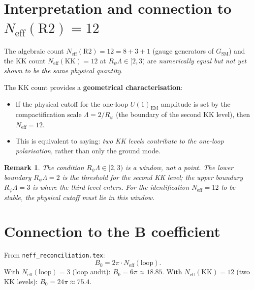 \documentclass[12pt,a4paper]{article}
\newtheorem{remark}{Remark}[section]
\newcommand{\Neff}{N_{\mathrm{eff}}}
\begin{document}
\section{Interpretation and connection to $N_{\mathrm{eff}}(\mathrm{R2}) = 12$}

The algebraic count $\Neff(\mathrm{R2}) = 12 = 8 + 3 + 1$ (gauge generators
of $G_{\mathrm{SM}}$) and the KK count $\Neff(\mathrm{KK}) = 12$ at $R_\psi\Lambda \in [2,3)$
are \emph{numerically equal but not yet shown to be the same physical quantity}.

The KK count provides a \textbf{geometrical characterisation}:
\begin{itemize}
  \item If the physical cutoff for the one-loop $U(1)_{\mathrm{EM}}$ amplitude
        is set by the compactification scale $\Lambda = 2/R_\psi$ (the
        boundary of the second KK level), then $\Neff = 12$.
  \item This is equivalent to saying: \emph{two KK levels contribute to the
        one-loop polarisation}, rather than only the ground mode.
\end{itemize}

\begin{remark}
The condition $R_\psi\Lambda \in [2,3)$ is a window, not a point.  The lower
boundary $R_\psi\Lambda = 2$ is the threshold for the second KK level; the upper
boundary $R_\psi\Lambda = 3$ is where the third level enters.  For the identification
$\Neff = 12$ to be stable, the physical cutoff must lie in this window.
\end{remark}

\section{Connection to the B coefficient}

From \texttt{neff\_reconciliation.tex}:
\begin{equation}
  B_0 = 2\pi \cdot \Neff(\mathrm{loop}).
\end{equation}
With $\Neff(\mathrm{loop}) = 3$ (loop audit): $B_0 = 6\pi \approx 18.85$.
With $\Neff(\mathrm{KK}) = 12$ (two KK levels): $B_0 = 24\pi \approx 75.4$.
\end{document}

